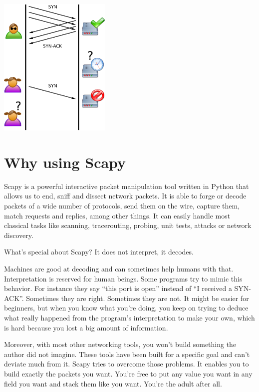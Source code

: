 \documentclass[11pt]{article}
\begin{document}
\begin{center}
\vfill
\includegraphics[width=0.4\textwidth]{tcp-synflood.png}\\[1cm]
\end{center}

\clearpage

\section{Why using Scapy}
Scapy is a powerful interactive packet manipulation tool written in Python that allows us to end, sniff and dissect network packets. It is able to forge or decode packets of a wide number of protocols, send them on the wire, capture them, match requests and replies, among other things. It can easily handle most classical tasks like scanning, tracerouting, probing, unit tests, attacks or network discovery.\vspace{5mm}

What's special about Scapy? It does not interpret, it decodes.\vspace{5mm}

Machines are good at decoding and can sometimes help humans with that. Interpretation is reserved for human beings. Some programs try to mimic this behavior. For instance they say “this port is open” instead of “I received a SYN-ACK”. Sometimes they are right. Sometimes they are not. It might be easier for beginners, but when you know what you’re doing, you keep on trying to deduce what really happened from the program’s interpretation to make your own, which is hard because you lost a big amount of information.\vspace{5mm}

Moreover, with most other networking tools, you won’t build something the author did not imagine. These tools have been built for a specific goal and can’t deviate much from it. Scapy tries to overcome those problems. It enables you to build exactly the packets you want. You’re free to put any value you want in any field you want and stack them like you want. You’re the adult after all.\vspace{5mm}
\end{document}
